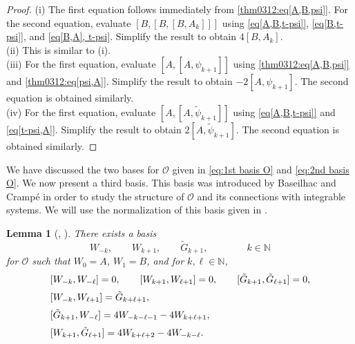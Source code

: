 \documentclass[11pt]{article}%
\theoremstyle{definition}
\theoremstyle{plain}
\newtheorem{lemma}[definition]{Lemma}
\begin{document}
\begin{proof}
(i) The first equation follows immediately from \eqref{thm0312:eq[A,B,psi]}.
For the second equation, evaluate $[B, [B, [B, A_k]]]$ using \eqref{eq[A,B,t-psi]}, \eqref{eq[B,t-psi]}, and \eqref{eq[B,A], t-psi}. 
Simplify the result to obtain $4[B, A_k]$. \\
(ii) This is similar to (i).\\
(iii) For the first equation, evaluate $[A, [A, \psi_{k+1}]]$ using \eqref{thm0312:eq[A,B,psi]} and \eqref{thm0312:eq[psi,A]}.
Simplify the result to obtain $-2[A, \psi_{k+1}]$.  
The second equation is obtained similarly.\\
(iv) For the first equation, evaluate $[A, [A, \tilde \psi_{k+1}]]$ using \eqref{eq[A,B,t-psi]} and \eqref{eq[t-psi,A]}.
Simplify the result to obtain $2[A, \tilde\psi_{k+1}]$.
The second equation is obtained similarly.
\end{proof}




We have discussed the two bases for $\mathcal{O}$ given in \eqref{eq:1st basis O} and \eqref{eq:2nd basis O}.
We now present a third basis.
This basis was introduced by Baseilhac and Cramp\'e \cite{2019BC} in order to study the structure of $\mathcal{O}$ and its connections with integrable systems.
We will use the normalization of this basis given in \cite{2023TerCAlg}.

\begin{lemma}[{\cite[Definition~4.1,~Theorem~2]{2019BC}, \cite[Lemma~3.8]{2023TerCAlg}}]
There exists a basis 
\begin{equation}\label{eq:3rd basis O}
	W_{-k}, \qquad W_{k+1}, \qquad \tilde{G}_{k+1}, \qquad \qquad k \in \mathbb{N}
\end{equation}
for $\mathcal{O}$ such that $W_0 = A$, $W_1=B$, and for $k, \ell \in \mathbb{N}$,
\begin{align}
	& [W_{-k}, W_{-\ell}] = 0 , \qquad
	[W_{k+1}, W_{\ell+1}] = 0, \qquad
	[\tilde{G}_{k+1}, \tilde{G}_{\ell+1}] = 0, \notag \\[0.2em]
	& [W_{-k}, W_{\ell+1}] = \tilde{G}_{k+\ell+1}, \label{eq:baO(1)}\\[0.2em]
	& [\tilde{G}_{k+1}, W_{-\ell}] = 4W_{-k-\ell-1} - 4W_{k+\ell+1}, \label{eq:baO(2)}\\[0.2em]
	& [W_{k+1}, \tilde{G}_{\ell+1}] = 4W_{k+\ell+2} - 4W_{-k-\ell}.\label{eq:baO(3)}
\end{align}
\end{lemma}
\end{document}
